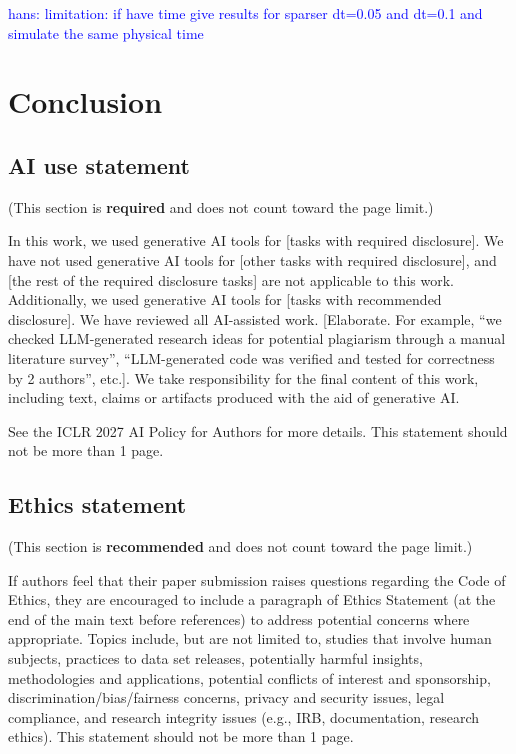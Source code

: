 \documentclass{article} %
\numberwithin{equation}{section}
\newcommand{\hans}[1]{\textcolor{blue}{hans: #1}}
\begin{document}





\hans{limitation:
if have time give results for sparser dt=0.05 and dt=0.1 and simulate the same physical time}








\newpage
\section{Conclusion}






\clearpage
\subsection*{AI use statement}

(This section is \textbf{required} and does not count toward the page limit.)

In this work, we used generative AI tools for [tasks with required disclosure].
We have not used generative AI tools for [other tasks with required disclosure],
and [the rest of the required disclosure tasks] are not applicable to this work.
Additionally, we used generative AI tools for [tasks with recommended
disclosure]. We have reviewed all AI-assisted work. [Elaborate. For example, “we
checked LLM-generated research ideas for potential plagiarism through a manual
literature survey”, “LLM-generated code was verified and tested for correctness
by 2 authors”, etc.]. We take responsibility for the final content of this work,
including text, claims or artifacts produced with the aid of generative AI.

See the ICLR 2027 AI Policy for Authors for more details. This statement should
not be more than 1 page.

\subsection*{Ethics statement}

(This section is \textbf{recommended} and does not count toward the page limit.)

If authors feel that their paper submission raises questions regarding the Code
of Ethics, they are encouraged to include a paragraph of Ethics Statement (at
the end of the main text before references) to address potential concerns where
appropriate. Topics include, but are not limited to, studies that involve human
subjects, practices to data set releases, potentially harmful insights,
methodologies and applications, potential conflicts of interest and sponsorship,
discrimination/bias/fairness concerns, privacy and security issues, legal
compliance, and research integrity issues (e.g., IRB, documentation, research
ethics). This statement should not be more than 1 page.
\end{document}
